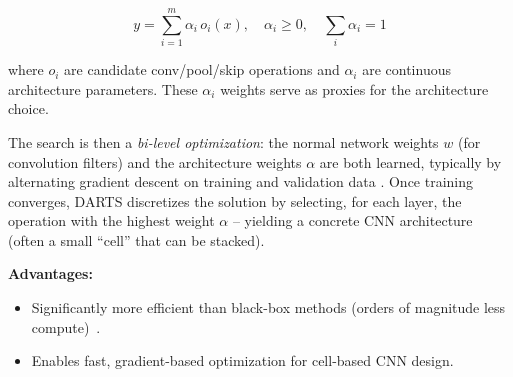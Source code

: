 \begin{equation}
y = \sum_{i=1}^{m} \alpha_i \, o_i(x), \quad \alpha_i \geq 0, \quad \sum_{i} \alpha_i = 1
\end{equation}

where $o_i$ are candidate conv/pool/skip operations and $\alpha_i$ are continuous architecture parameters. These $\alpha_i$ weights serve as proxies for the architecture choice.


The search is then a \textit{bi-level optimization}: the normal network weights $w$ (for convolution filters) and the architecture weights $\alpha$ are both learned, typically by alternating gradient descent on training and validation data \cite{elsken2019neural}. Once training converges, DARTS discretizes the solution by selecting, for each layer, the operation with the highest weight $\alpha$ – yielding a concrete CNN architecture (often a small ``cell'' that can be stacked).


\textbf{Advantages:}
\begin{itemize}
    \item Significantly more efficient than black-box methods (orders of magnitude less compute)~\cite{liu2018darts}.
    \item Enables fast, gradient-based optimization for cell-based CNN design.
\end{itemize}

